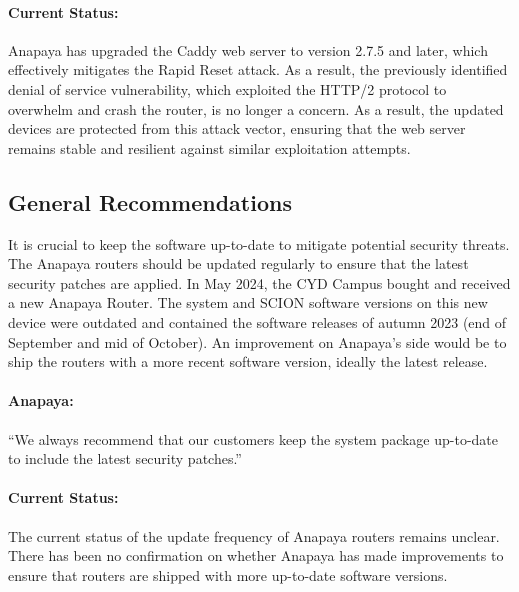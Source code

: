 \paragraph{Current Status:}
Anapaya has upgraded the Caddy web server to version 2.7.5 and later, which effectively mitigates the Rapid Reset attack.
As a result, the previously identified denial of service vulnerability, which exploited the HTTP/2 protocol to overwhelm and crash the router, is no longer a concern.
As a result, the updated devices are protected from this attack vector, ensuring that the web server remains stable and resilient against similar exploitation attempts.

\subsection{General Recommendations}
\label{sec:general-recommendations}

It is crucial to keep the software up-to-date to mitigate potential security threats.
The Anapaya routers should be updated regularly to ensure that the latest security patches are applied.
In May 2024, the CYD Campus bought and received a new Anapaya Router.
The system and SCION software versions on this new device were outdated and contained the software releases of autumn 2023 (end of September and mid of October).
An improvement on Anapaya's side would be to ship the routers with a more recent software version, ideally the latest release.

\begin{boxH}
\paragraph{Anapaya:}
``We always recommend that our customers keep the system package up-to-date to include the latest security patches.''
\end{boxH}

\paragraph{Current Status:}
The current status of the update frequency of Anapaya routers remains unclear.
There has been no confirmation on whether Anapaya has made improvements to ensure that routers are shipped with more up-to-date software versions.


